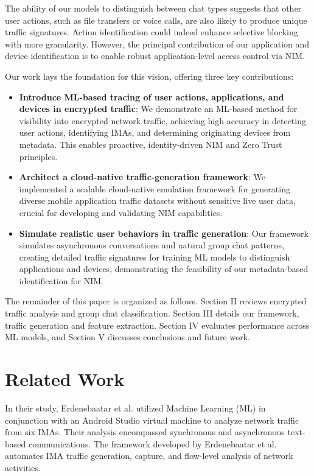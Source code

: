 \documentclass[conference]{IEEEtran}
\begin{document}
The ability of our models to distinguish between chat types suggests that other user actions, such as file transfers or voice calls, are also likely to produce unique traffic signatures. Action identification could indeed enhance selective blocking with more granularity. However, the principal contribution of our application and device identification is to enable robust application-level access control via NIM.

Our work lays the foundation for this vision, offering three key contributions:
\begin{itemize}
    \item \textbf{Introduce ML-based tracing of user actions, applications, and devices in encrypted traffic}: We demonstrate an ML-based method for visibility into encrypted network traffic, achieving high accuracy in detecting user actions, identifying IMAs, and determining originating devices from metadata. This enables proactive, identity-driven NIM and Zero Trust principles.
    \item \textbf{Architect a cloud-native traffic-generation framework}: We implemented a scalable cloud-native emulation framework for generating diverse mobile application traffic datasets without sensitive live user data, crucial for developing and validating NIM capabilities.
    \item \textbf{Simulate realistic user behaviors in traffic generation}: Our framework simulates asynchronous conversations and natural group chat patterns, creating detailed traffic signatures for training ML models to distinguish applications and devices, demonstrating the feasibility of our metadata-based identification for NIM.
\end{itemize}

The remainder of this paper is organized as follows. Section II reviews encrypted traffic analysis and group chat classification. Section III details our framework, traffic generation and feature extraction. Section IV evaluates performance across ML models, and Section V discusses conclusions and future work.

\section{Related Work}
In their study, Erdenebaatar et al.\cite{b1} utilized Machine Learning (ML) in conjunction with an Android Studio virtual machine to analyze network traffic from six IMAs. Their analysis encompassed synchronous and asynchronous text-based communications. The framework developed by Erdenebaatar et al. automates IMA traffic generation, capture, and flow-level analysis of network activities.
\end{document}
